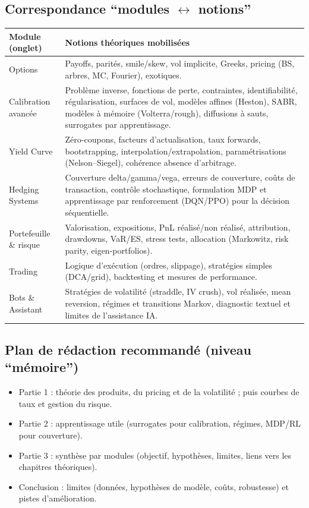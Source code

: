 \documentclass[11pt,a4paper]{article}
\newcommand{\1}{\mathbf{1}}
\begin{document}
\subsection*{Correspondance ``modules \texorpdfstring{$\leftrightarrow$}{<->} notions''}
\begin{center}
\begin{tabularx}{\textwidth}{@{}lX@{}}
\toprule
\textbf{Module (onglet)} & \textbf{Notions th\'eoriques mobilis\'ees} \\
\midrule
Options & Payoffs, parit\'es, smile/skew, vol implicite, Greeks, pricing (BS, arbres, MC, Fourier), exotiques. \\
Calibration avanc\'ee & Probl\`eme inverse, fonctions de perte, contraintes, identifiabilit\'e, r\'egularisation,
surfaces de vol, mod\`eles affines (Heston), SABR, mod\`eles \`a m\'emoire (Volterra/rough), diffusions \`a sauts,
surrogates par apprentissage. \\
Yield Curve & Z\'ero-coupons, facteurs d'actualisation, taux forwards, bootstrapping, interpolation/extrapolation,
param\'etrisations (Nelson--Siegel), coh\'erence absence d'arbitrage. \\
Hedging Systems & Couverture delta/gamma/vega, erreurs de couverture, co\^uts de transaction, contr\^ole stochastique,
formulation MDP et apprentissage par renforcement (DQN/PPO) pour la d\'ecision s\'equentielle. \\
Portefeuille \& risque & Valorisation, expositions, PnL r\'ealis\'e/non r\'ealis\'e, attribution, drawdowns,
VaR/ES, stress tests, allocation (Markowitz, risk parity, eigen-portfolios). \\
Trading & Logique d'ex\'ecution (ordres, slippage), strat\'egies simples (DCA/grid), backtesting et mesures de performance. \\
Bots \& Assistant & Strat\'egies de volatilité (straddle, IV crush), vol r\'ealis\'ee, mean reversion, r\'egimes
et transitions Markov, diagnostic textuel et limites de l'assistance IA. \\
\bottomrule
\end{tabularx}
\end{center}

\subsection*{Plan de r\'edaction recommand\'e (niveau ``m\'emoire'')}
\begin{itemize}
  \item Partie 1 : th\'eorie des produits, du pricing et de la volatilit\'e ; puis courbes de taux et gestion du risque.
  \item Partie 2 : apprentissage utile (surrogates pour calibration, r\'egimes, MDP/RL pour couverture).
  \item Partie 3 : synth\`ese par modules (objectif, hypoth\`eses, limites, liens vers les chapitres th\'eoriques).
  \item Conclusion : limites (donn\'ees, hypoth\`eses de mod\`ele, co\^uts, robustesse) et pistes d'am\'elioration.
\end{itemize}
\newpage
\end{document}
